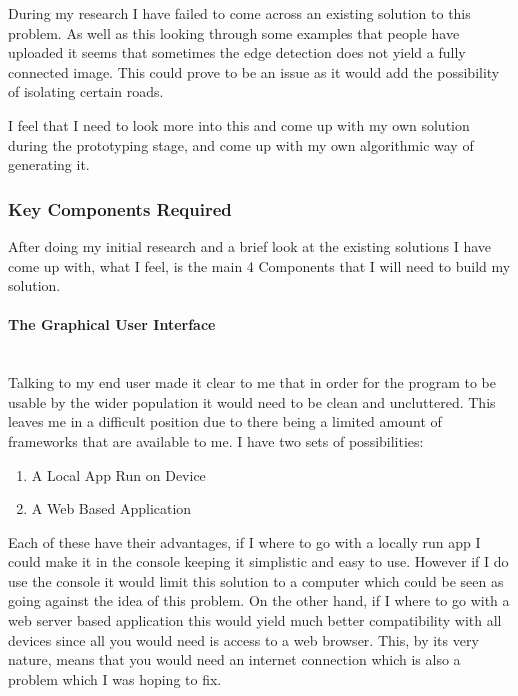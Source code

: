 \begin{flushleft}
            During my research I have failed to come across an existing solution to this problem. As well as this looking through some examples that people have uploaded it seems that sometimes the edge 
            detection does not yield a fully connected image. This could prove to be an issue as it would add the possibility of isolating certain roads. \\ \bk
            
            I feel that I need to look more into this and come up with my own solution during the prototyping stage, and come up with my own algorithmic way of generating it. \\ \bk
            
            \bk

            \subsubsection{Key Components Required}
            After doing my initial research and a brief look at the existing solutions I have come up with, what I feel, is the main 4 Components that I will need to build my solution. \\ \bk
            
            \paragraph{The Graphical User Interface} \mbox{} \\
            Talking to my end user made it clear to me that in order for the program to be usable by the wider population it would need to be clean and uncluttered. This leaves me in a difficult position 
            due to there being a limited amount of frameworks that are available to me. I have two sets of possibilities: \\
            \begin{enumerate}
                \item A Local App Run on Device
                \item A Web Based Application
            \end{enumerate}
            Each of these have their advantages, if I where to go with a locally run app I could make it in the console keeping it simplistic and easy to use. However if I do use the console it would limit
             this solution to a computer which could be seen as going against the idea of this problem. On the other hand, if I where to go with a web server based application this would yield much better 
             compatibility with all devices since all you would need is access to a web browser. This, by its very nature, means that you would need an internet connection which is also a problem which I
              was hoping to fix. \\ \bk
            

\end{flushleft}
